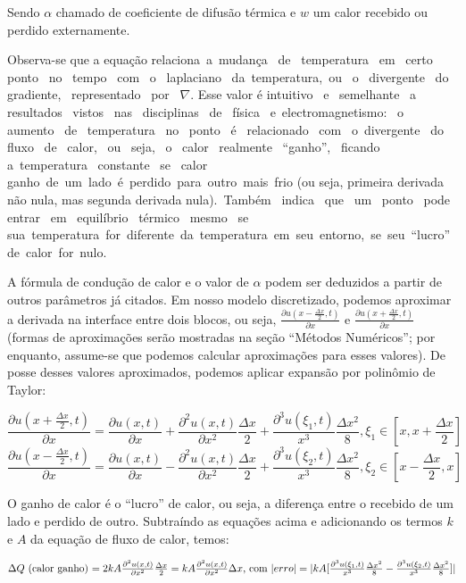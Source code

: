 \documentclass[12pt,fleqn]{article}
\begin{document}
Sendo $\alpha$ chamado de coeficiente de difusão térmica e $w$ um calor recebido ou perdido externamente.

Observa-se que a equação relaciona a mudança  de  temperatura  em  certo  ponto  no  tempo  com  o  laplaciano  da temperatura, ou  o  divergente  do  gradiente,  representado  por  $\nabla$. Esse valor é intuitivo  e  semelhante  a  resultados  vistos  nas  disciplinas  de  física  e electromagnetismo:  o  aumento  de  temperatura  no  ponto  é  relacionado  com  o divergente  do  fluxo  de  calor,  ou  seja,  o  calor  realmente  “ganho”,  ficando  a temperatura  constante  se  calor  ganho de um lado é perdido para outro mais frio (ou seja, primeira derivada não nula, mas segunda derivada nula). Também  indica  que  um  ponto  pode  entrar  em  equilíbrio  térmico  mesmo  se  sua temperatura for diferente da temperatura em seu entorno, se seu “lucro” de calor for nulo.

A fórmula de condução de calor e o valor de $\alpha$ podem ser deduzidos a partir de outros parâmetros já citados. Em nosso modelo discretizado, podemos aproximar a derivada na interface entre dois blocos, ou seja, $\frac{\partial u(x - \frac{\Delta x}{2}, t)}{\partial x}$ e $\frac{\partial u(x + \frac{\Delta x}{2}, t)}{\partial x}$ (formas de aproximações serão mostradas na seção ``Métodos Numéricos''; por enquanto, assume-se que podemos calcular aproximações para esses valores). De posse desses valores aproximados, podemos aplicar expansão por polinômio de Taylor:

\[
\frac{\partial u(x + \frac{\Delta x}{2}, t)}{\partial x} = \frac{\partial u(x, t)}{\partial x} + \frac{\partial^2 u(x, t)}{\partial x^2} \frac{\Delta x}{2} + \frac{\partial^3 u(\xi_1, t)}{x^3} \frac{\Delta x^2}{8}, \xi_1 \in [x, x + \frac{\Delta x}{2}]
\]
\[
\frac{\partial u(x - \frac{\Delta x}{2}, t)}{\partial x} = \frac{\partial u(x, t)}{\partial x} - \frac{\partial^2 u(x, t)}{\partial x^2} \frac{\Delta x}{2} + \frac{\partial^3 u(\xi_2, t)}{x^3} \frac{\Delta x^2}{8}, \xi_2 \in [x - \frac{\Delta x}{2}, x]
\]

O ganho de calor é o ``lucro'' de calor, ou seja, a diferença entre o recebido de um lado e perdido de outro. Subtraíndo as equações acima e adicionando os termos $k$ e $A$ da equação de fluxo de calor, temos:

\[\Delta Q $ (calor ganho) $ = 2 k A \frac{\partial^2 u(x, t)}{\partial x^2} \frac{\Delta x}{2} = k A \frac{\partial^2 u(x, t)}{\partial x^2} \Delta x $, com $|erro| = |k A [ \frac{\partial^3 u(\xi_1, t)}{x^3} \frac{\Delta x^2}{8} - \frac{\partial^3 u(\xi_2, t)}{x^3} \frac{\Delta x^2}{8}]|\]
\end{document}
